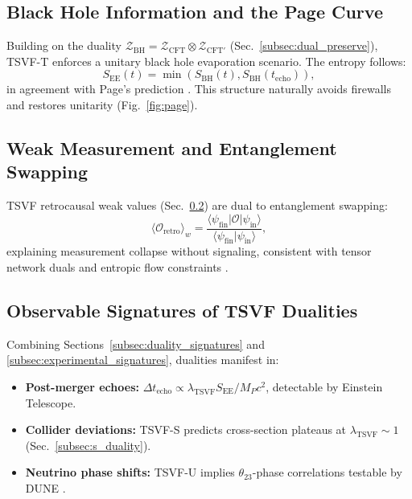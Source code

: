 \documentclass[twocolumn,superscriptaddress,floatfix]{revtex4-2}
\begin{document}
\subsection{Black Hole Information and the Page Curve}
\label{subsec:page_curve}

Building on the duality $\mathcal{Z}_{\text{BH}} = \mathcal{Z}_{\text{CFT}} \otimes \mathcal{Z}_{\text{CFT}'}$ (Sec.~\ref{subsec:dual_preserve}), TSVF-T enforces a unitary black hole evaporation scenario. The entropy follows:
\begin{equation}
S_{\text{EE}}(t) = \min\left(S_{\text{BH}}(t), S_{\text{BH}}(t_{\text{echo}})\right),
\end{equation}
in agreement with Page's prediction \cite{Page:1993}. This structure naturally avoids firewalls and restores unitarity (Fig.~\ref{fig:page}).

\subsection{Weak Measurement and Entanglement Swapping}
\label{subsec:weak_swapping}

TSVF retrocausal weak values (Sec.~\ref{subsec:weak_swapping}) are dual to entanglement swapping:
\begin{equation}
\langle \mathcal{O}_{\text{retro}} \rangle_w = \frac{\langle \psi_{\text{fin}}|\mathcal{O}|\psi_{\text{in}}\rangle}{\langle \psi_{\text{fin}}|\psi_{\text{in}}\rangle},
\end{equation}
explaining measurement collapse without signaling, consistent with tensor network duals and entropic flow constraints \cite{Aharonov:2008}.

\subsection{Observable Signatures of TSVF Dualities}
\label{subsec:tsvf_signatures}

Combining Sections~\ref{subsec:duality_signatures} and \ref{subsec:experimental_signatures}, dualities manifest in:
\begin{itemize}
\item \textbf{Post-merger echoes:} $\Delta t_{\text{echo}} \propto \lambda_{\text{TSVF}} S_{\text{EE}} / M_P c^2$, detectable by Einstein Telescope.
\item \textbf{Collider deviations:} TSVF-S predicts cross-section plateaus at $\lambda_{\text{TSVF}} \sim 1$ (Sec.~\ref{subsec:s_duality}).
\item \textbf{Neutrino phase shifts:} TSVF-U implies $\theta_{23}$-phase correlations testable by DUNE \cite{Abi2021}.
\end{itemize}
\end{document}
